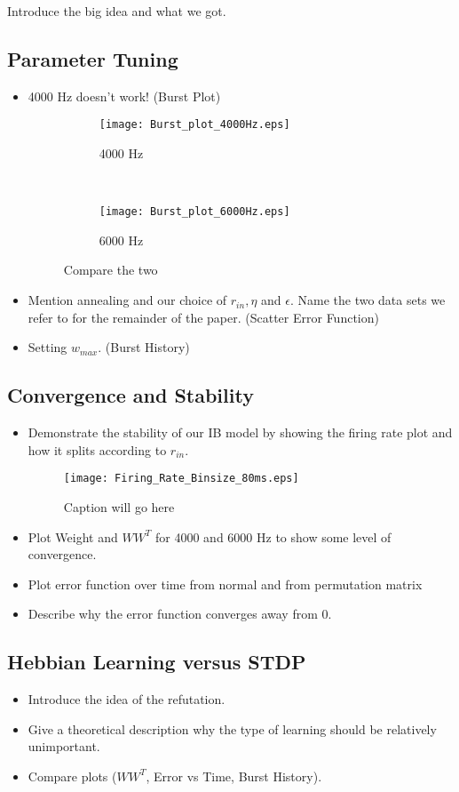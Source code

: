 Introduce the big idea and what we got.

\subsection{Parameter Tuning}

\begin{itemize}
\item 4000 Hz doesn't work! (Burst Plot)

\begin{figure}
\centering
\begin{subfigure}[b]{0.49\textwidth}
\texttt{[image: Burst\_plot\_4000Hz.eps]}
\caption{4000 Hz}
\label{burstSTDP:4000}
\end{subfigure}
\,
\begin{subfigure}[b]{0.49\textwidth}
\texttt{[image: Burst\_plot\_6000Hz.eps]}
\caption{6000 Hz}
\label{burstSTDP:6000}
\end{subfigure}
\caption{Compare the two}
\label{burstSTDP}
\end{figure}

\item Mention annealing and our choice of \(r_{in}, \eta\) and \(\epsilon\). Name the two data sets we refer to for the remainder of the paper. (Scatter Error Function)

\item Setting \(w_{max}\). (Burst History)
\end{itemize}

\subsection{Convergence and Stability}

\begin{itemize}
\item Demonstrate the stability of our IB model by showing the firing rate plot and how it splits according to \(r_{in}\).

\begin{figure}[H]
\centering
\texttt{[image: Firing\_Rate\_Binsize\_80ms.eps]}
\label{FR}
\caption{Caption will go here}
\end{figure}

\item Plot Weight and \(WW^T\) for 4000 and 6000 Hz to show some level of convergence.

\item Plot error function over time from normal and from permutation matrix

\item Describe why the error function converges away from 0.
\end{itemize}

\subsection{Hebbian Learning versus STDP}

\begin{itemize}
\item Introduce the idea of the refutation. 
\item Give a theoretical description why the type of learning should be relatively unimportant.
\item Compare plots (\(WW^T\), Error vs Time, Burst History).
\end{itemize}